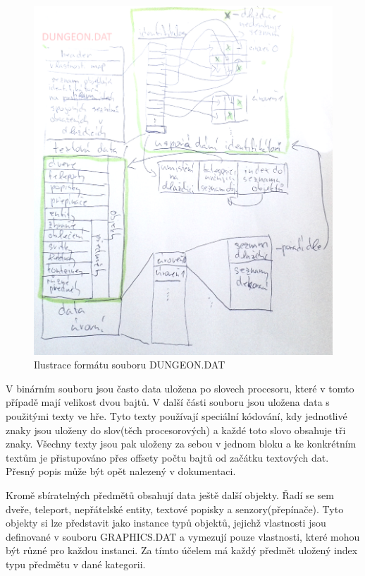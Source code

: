 \begin{figure}[H]\centering
\includegraphics[width=\textwidth]{./img/DM-dungeon-dat.png}
\caption{Ilustrace formátu souboru DUNGEON.DAT}
\label{DM-dungeon-dat:analyza}
\end{figure}

V binárním souboru jsou často data uložena po slovech procesoru, které v tomto případě mají velikost dvou bajtů. 
V další části souboru jsou uložena data s použitými texty ve hře. Tyto texty používají speciální kódování,
kdy jednotlivé znaky jsou uloženy do slov(těch procesorových) a každé toto slovo obsahuje tři znaky. Všechny 
texty jsou pak uloženy za sebou v jednom bloku a ke konkrétním textům je přistupováno přes offsety počtu bajtů
od začátku textových dat. Přesný popis může být opět nalezený v dokumentaci\cite{TechnicalDocumentationFontanel05}.

Kromě sbíratelných předmětů obsahují data ještě další objekty. Řadí se sem dveře, 
teleport, nepřátelské entity, textové popisky a senzory(přepínače). Tyto objekty si lze představit jako instance typů objektů, 
jejichž vlastnosti jsou definované v souboru GRAPHICS.DAT a vymezují pouze vlastnosti, které mohou být různé pro každou instanci.
Za tímto účelem má každý předmět uložený index typu předmětu v dané kategorii.  

